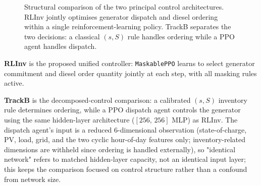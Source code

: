 \begin{figure}[htbp]
\centering
{}
\caption{Structural comparison of the two principal control
architectures. RLInv jointly optimises generator dispatch and diesel
ordering within a single reinforcement-learning policy. TrackB separates
the two decisions: a classical $(s,S)$ rule handles ordering while a PPO
agent handles dispatch.}
\label{fig:rlinv_trackb}
\end{figure}

\textbf{RLInv} is the proposed unified controller: \texttt{MaskablePPO}
learns to select generator commitment and diesel order quantity jointly
at each step, with all masking rules active.

\textbf{TrackB} is the decomposed-control comparison: a calibrated $(s,S)$
inventory rule determines ordering, while a PPO dispatch agent controls
the generator using the same hidden-layer architecture ($[256,\,256]$
MLP) as RLInv. The dispatch agent's input is a reduced 6-dimensional
observation (state-of-charge, PV, load, grid, and the two cyclic
hour-of-day features only; inventory-related dimensions are withheld
since ordering is handled externally), so "identical network" refers to
matched hidden-layer capacity, not an identical input layer; this keeps
the comparison focused on control structure rather than a confound from
network size.

